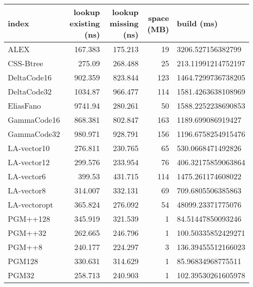 \begin{tabular}{lrrrl}
\hline
 index             &   lookup existing (ns) &   lookup missing (ns) &   space (MB) & build (ms)         \\
\hline
 ALEX              &               167.383  &              175.213  &           19 & 3206.527156382799  \\
 CSS-Btree         &               275.09   &              268.488  &           25 & 213.11991214752197 \\
 DeltaCode16       &               902.359  &              823.844  &          123 & 1464.7299736738205 \\
 DeltaCode32       &              1034.87   &              966.477  &          114 & 1581.4263638108969 \\
 EliasFano         &              9741.94   &              280.261  &           50 & 1588.2252238690853 \\
 GammaCode16       &               868.381  &              802.847  &          163 & 1189.699086919427  \\
 GammaCode32       &               980.971  &              928.791  &          156 & 1196.6758254915476 \\
 LA-vector10       &               276.811  &              230.765  &           65 & 530.0668471492826  \\
 LA-vector12       &               299.576  &              233.954  &           76 & 406.32175859063864 \\
 LA-vector6        &               399.53   &              431.715  &          114 & 1475.261174608022  \\
 LA-vector8        &               314.007  &              332.131  &           69 & 709.6805506385863  \\
 LA-vectoropt      &               365.824  &              276.092  &           54 & 48099.23371775076  \\
 PGM++128          &               345.919  &              321.539  &            1 & 84.51447850093246  \\
 PGM++32           &               262.665  &              246.796  &            1 & 100.50335852429271 \\
 PGM++8            &               240.177  &              224.297  &            3 & 136.39455512166023 \\
 PGM128            &               330.631  &              314.629  &            1 & 85.96834968775511  \\
 PGM32             &               258.713  &              240.903  &            1 & 102.39530261605978 \\

\end{tabular}
